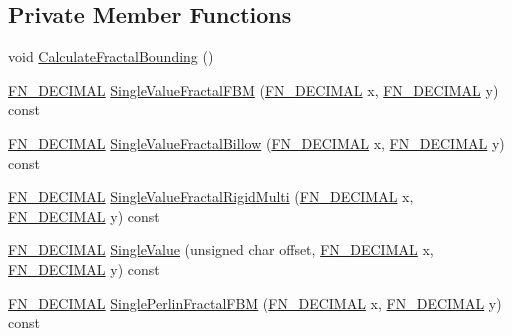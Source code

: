 \subsection*{Private Member Functions}
\begin{DoxyCompactItemize}
\item 
void \mbox{\hyperlink{class_fast_noise_aebff47a0c73a310474e0e668fec3586c}{Calculate\+Fractal\+Bounding}} ()
\item 
\mbox{\hyperlink{_fast_noise_8h_a75a9ef6d2541c4921815b885bfd449c3}{F\+N\+\_\+\+D\+E\+C\+I\+M\+AL}} \mbox{\hyperlink{class_fast_noise_a19cdde687bd3d06fa84ea16f52dfe96b}{Single\+Value\+Fractal\+F\+BM}} (\mbox{\hyperlink{_fast_noise_8h_a75a9ef6d2541c4921815b885bfd449c3}{F\+N\+\_\+\+D\+E\+C\+I\+M\+AL}} x, \mbox{\hyperlink{_fast_noise_8h_a75a9ef6d2541c4921815b885bfd449c3}{F\+N\+\_\+\+D\+E\+C\+I\+M\+AL}} y) const
\item 
\mbox{\hyperlink{_fast_noise_8h_a75a9ef6d2541c4921815b885bfd449c3}{F\+N\+\_\+\+D\+E\+C\+I\+M\+AL}} \mbox{\hyperlink{class_fast_noise_a9ce9cdb72f3c9acaf76511d723e8e1ae}{Single\+Value\+Fractal\+Billow}} (\mbox{\hyperlink{_fast_noise_8h_a75a9ef6d2541c4921815b885bfd449c3}{F\+N\+\_\+\+D\+E\+C\+I\+M\+AL}} x, \mbox{\hyperlink{_fast_noise_8h_a75a9ef6d2541c4921815b885bfd449c3}{F\+N\+\_\+\+D\+E\+C\+I\+M\+AL}} y) const
\item 
\mbox{\hyperlink{_fast_noise_8h_a75a9ef6d2541c4921815b885bfd449c3}{F\+N\+\_\+\+D\+E\+C\+I\+M\+AL}} \mbox{\hyperlink{class_fast_noise_a9061e8fb70914a8aa976d861d21a4f63}{Single\+Value\+Fractal\+Rigid\+Multi}} (\mbox{\hyperlink{_fast_noise_8h_a75a9ef6d2541c4921815b885bfd449c3}{F\+N\+\_\+\+D\+E\+C\+I\+M\+AL}} x, \mbox{\hyperlink{_fast_noise_8h_a75a9ef6d2541c4921815b885bfd449c3}{F\+N\+\_\+\+D\+E\+C\+I\+M\+AL}} y) const
\item 
\mbox{\hyperlink{_fast_noise_8h_a75a9ef6d2541c4921815b885bfd449c3}{F\+N\+\_\+\+D\+E\+C\+I\+M\+AL}} \mbox{\hyperlink{class_fast_noise_a9704c1a9f62ad5fcf8e42b15ad8df389}{Single\+Value}} (unsigned char offset, \mbox{\hyperlink{_fast_noise_8h_a75a9ef6d2541c4921815b885bfd449c3}{F\+N\+\_\+\+D\+E\+C\+I\+M\+AL}} x, \mbox{\hyperlink{_fast_noise_8h_a75a9ef6d2541c4921815b885bfd449c3}{F\+N\+\_\+\+D\+E\+C\+I\+M\+AL}} y) const
\item 
\mbox{\hyperlink{_fast_noise_8h_a75a9ef6d2541c4921815b885bfd449c3}{F\+N\+\_\+\+D\+E\+C\+I\+M\+AL}} \mbox{\hyperlink{class_fast_noise_a6f38e0737ecab4f680e41936f5381141}{Single\+Perlin\+Fractal\+F\+BM}} (\mbox{\hyperlink{_fast_noise_8h_a75a9ef6d2541c4921815b885bfd449c3}{F\+N\+\_\+\+D\+E\+C\+I\+M\+AL}} x, \mbox{\hyperlink{_fast_noise_8h_a75a9ef6d2541c4921815b885bfd449c3}{F\+N\+\_\+\+D\+E\+C\+I\+M\+AL}} y) const

\end{DoxyCompactItemize}

